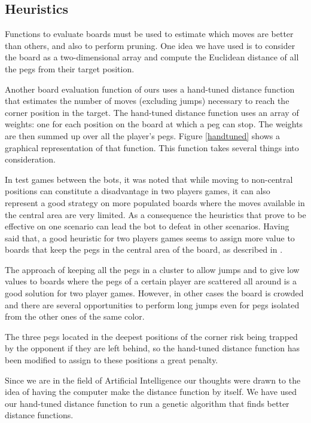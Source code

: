 


\subsection{Heuristics}

Functions to evaluate boards must be used to estimate which moves are
better than others, and also to perform pruning. One idea we have used
is to consider the board as a two-dimensional array and compute the
Euclidean distance of all the pegs from their target position.

Another board evaluation function of ours uses a hand-tuned distance
function that estimates the number of moves (excluding jumps)
necessary to reach the corner position in the target. The hand-tuned
distance function uses an array of weights: one for each position on
the board at which a peg can stop. The weights are then summed up over
all the player's pegs. Figure \ref{handtuned} shows a graphical
representation of that function. This function takes several things
into consideration.

In test games between the bots, it was noted that while moving to
non-central positions can constitute a disadvantage in two players games, it can
also represent a good strategy on more populated boards where the moves available in
the central area are very limited. As a consequence the heuristics that prove to
be effective on one scenario can lead the bot to defeat in other scenarios.
Having said that, a good heuristic for two players games seems to assign more
value to boards that keep the pegs in the central area of the board, as
described in \cite{ulfhake}.

The approach of keeping all the pegs in a cluster to allow jumps and to give low
values to boards where the pegs of a certain player are scattered all around is
a good solution for two player games. However, in other cases the board is crowded
and there are several opportunities to perform long jumps even for pegs isolated
from the other ones of the same color.

The three pegs located in the deepest positions of the corner risk being trapped
by the opponent if they are left behind, so the hand-tuned distance function has
been modified to assign to these positions a great penalty.

Since we are in the field of Artificial Intelligence our thoughts
were drawn to the idea of having the computer make the distance
function by itself. We have used our hand-tuned distance function to run
a genetic algorithm that finds better distance functions.


